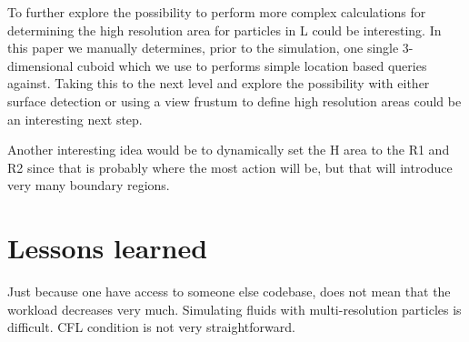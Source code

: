 \documentclass[../../main.tex]{subfiles}
\begin{document}
To further explore the possibility to perform more complex calculations for determining the high resolution area for particles in L could be interesting. In this paper we manually determines, prior to the simulation, one single 3-dimensional cuboid which we use to performs simple location based queries against. Taking this to the next level and explore the possibility with either surface detection or using a view frustum to define high resolution areas could be an interesting next step. 

Another interesting idea would be to dynamically set the H area to the R1 and R2 since that is probably where the most action will be, but that will introduce very many boundary regions.

\section{Lessons learned}
Just because one have access to someone else codebase, does not mean that the workload decreases very much. Simulating fluids with multi-resolution particles is difficult. CFL condition is not very straightforward. 
\end{document}
